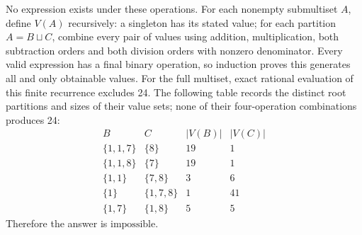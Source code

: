 No expression exists under these operations. For each nonempty submultiset $A$, define $V(A)$ recursively: a singleton has its stated value; for each partition $A=B\sqcup C$, combine every pair of values using addition, multiplication, both subtraction orders and both division orders with nonzero denominator. Every valid expression has a final binary operation, so induction proves this generates all and only obtainable values. For the full multiset, exact rational evaluation of this finite recurrence excludes 24. The following table records the distinct root partitions and sizes of their value sets; none of their four-operation combinations produces 24: \[\begin{array}{c|c|r|r}B&C&|V(B)|&|V(C)|\\\hline\{1,1,7\}&\{8\}&19&1\\\{1,1,8\}&\{7\}&19&1\\\{1,1\}&\{7,8\}&3&6\\\{1\}&\{1,7,8\}&1&41\\\{1,7\}&\{1,8\}&5&5\end{array}\] Therefore the answer is $\boxed{\text{impossible}}$.
